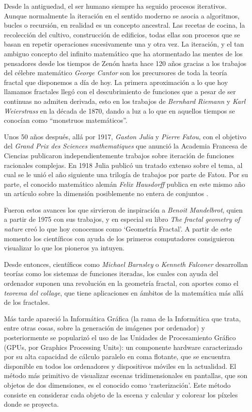 
Desde la antiguedad, el ser humano siempre ha seguido procesos iterativos. Aunque normalmente la iteración en el sentido moderno se asocia a algoritmos, bucles o recursión, en realidad es un concepto ancestral. Las recetas de cocina, la recolección del cultivo, construcción de edificios, todas ellas son procesos que se basan en repetir operaciones sucesivamente una y otra vez. La iteración, y el tan ambiguo concepto del infinito matemático que ha atormentado las mentes de los pensadores desde los tiempos de Zenón hasta hace 120 años gracias a los trabajos del célebre matemático \textit{George Cantor} son los precursores de toda la teoría fractal que disponemos a día de hoy. La primera aproximación a lo que hoy llamamos fractales llegó con el descubrimiento de funciones que a pesar de ser continuas no admiten derivada, esto en los trabajos de \textit{Bernhard Riemann} y \textit{Karl Weierstrass} en la década de 1870, dando a luz a lo que en aquellos tiempos se conocían como ``monstruos matemáticos''.

Unos 50 años después, allá por 1917, \textit{Gaston Julia} y \textit{Pierre Fatou}, con el objetivo del \textit{Grand Prix des Sciences mathematiques} que anunció la Academia Francesa de Ciencias publicaron independientemente trabajos sobre iteración de funciones racionales complejas. En 1918 Julia publicó un tratado extenso sobre el tema, al cual se le unió el año siguiente una trilogía de trabajos por parte de Fatou. Por su parte, el conocido matemático alemán \textit{Felix Hausdorff} publica en este mismo año un artículo sobre la dimensión posiblemente no entera de conjuntos \cite{Hausdorff1919}. 

Fueron estos avances los que sirvieron de inspiración a \textit{Benoit Mandelbrot}, quien a partir de 1975 con sus trabajos, y en especial su libro \textit{The fractal geometry of nature} \cite{Mandelbrot} creó lo que hoy conocemos como `Geometría Fractal'. A partir de este momento los científicos con ayuda de los primeros computadores consiguieron visualizar lo que los pioneros ya intuyen.

Desde entonces, científicos como \textit{Michael Barnsley} o \textit{Kenneth Falconer} desarrollan teorías como los sistemas de funciones iteradas, los cuales con ayuda del ordenador suponen una revolución en la geometría fractal, con aportes como el \textit{teorema del collage}, que tiene aplicaciones en ámbitos de la matemática más allá de los fractales.

Más tarde apareció la Informática Gráfica (la rama de la Informática que trata, entre otras cosas, sobre la generación de imágenes por ordenador) y posteriormente se popularizó el uso de las Unidades de Procesamiento Gráfico (GPUs, por Graphics Processing Units): un componente hardware caracterizado por su alta capacidad de cálculo paralelo en coma flotante, que se encuentra disponible en todos los ordenadores y dispositivos móviles en la actualidad. El método más primitivo de visualizar escenas tridimensionales en pantallas, que son objetos de dos dimensiones, es el conocido como `rasterización'. Este método consiste en considerar cada objeto de la escena y calcular y colorear los píxeles donde se proyecta. 

